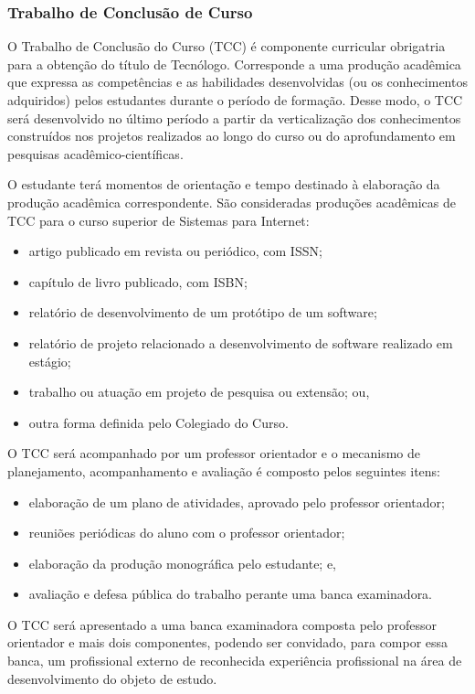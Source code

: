 \subsubsection{Trabalho de Conclusão de Curso}


O Trabalho de Conclusão do Curso (TCC) é componente curricular obrigatria para a obtenção do título de Tecnólogo. Corresponde a uma produção acadêmica que expressa as competências e as habilidades desenvolvidas (ou os conhecimentos adquiridos) pelos estudantes durante o período de formação. Desse modo, o TCC será desenvolvido no último período a partir da verticalização dos conhecimentos construídos nos projetos realizados ao longo do curso ou do aprofundamento em pesquisas acadêmico-científicas.

O estudante terá momentos de orientação e tempo destinado à elaboração da produção acadêmica correspondente. São consideradas produções acadêmicas de TCC para o curso superior de Sistemas para Internet:

\begin{itemize}
	\item artigo publicado em revista ou periódico, com ISSN;
	\item capítulo de livro publicado, com ISBN;
	\item relatório de desenvolvimento de um protótipo de um software;
	\item relatório de projeto relacionado a desenvolvimento de software realizado em estágio;
	\item trabalho ou atuação em projeto de pesquisa ou extensão; ou,
	\item outra forma definida pelo Colegiado do Curso.
\end{itemize}
	
O TCC será acompanhado por um professor orientador e o mecanismo de planejamento, acompanhamento e avaliação é composto pelos seguintes itens:
\begin{itemize}
	\item elaboração de um plano de atividades, aprovado pelo professor orientador;
	\item reuniões periódicas do aluno com o professor orientador;
	\item elaboração da produção monográfica pelo estudante; e,
	\item avaliação e defesa pública do trabalho perante uma banca examinadora.
\end{itemize}

O TCC será apresentado a uma banca examinadora composta pelo professor orientador e mais dois componentes, podendo ser convidado, para compor essa banca, um profissional externo de reconhecida experiência profissional na área de desenvolvimento do objeto de estudo.

